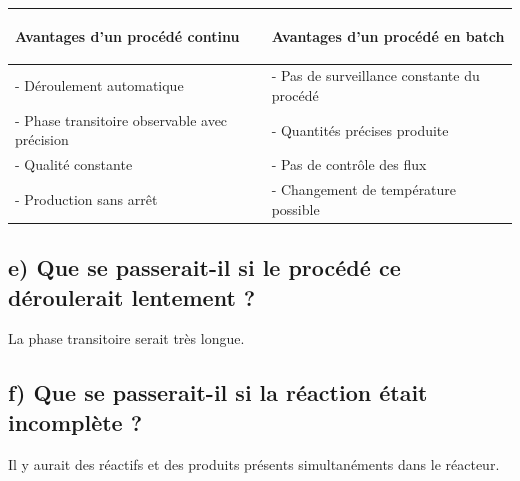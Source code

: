 \documentclass[a4paper,11pt, french]{article}
\begin{document}
\begin{table}[h]\centering
\begin{tabular}{|m{}|m{}|}\hline
	\rowcolor{Gray}	
	\begin{center}Avantages d'un \textbf{procédé continu}\end{center} & \begin{center}Avantages d'un procédé en \textbf{batch}\end{center} \\\hline
	- Déroulement automatique & - Pas de surveillance constante du procédé \\
	- Phase transitoire observable avec précision & - Quantités précises produite \\
	- Qualité constante & - Pas de contrôle des flux \\
	- Production sans arrêt & - Changement de température possible \\\hline
\end{tabular}
\end{table}

	\subsection*{e) Que se passerait-il si le procédé ce déroulerait lentement ?}
La phase transitoire serait très longue.

	\subsection*{f) Que se passerait-il si la réaction était incomplète ?}
Il y aurait des réactifs et des produits présents simultanéments dans le réacteur. 
\end{document}
